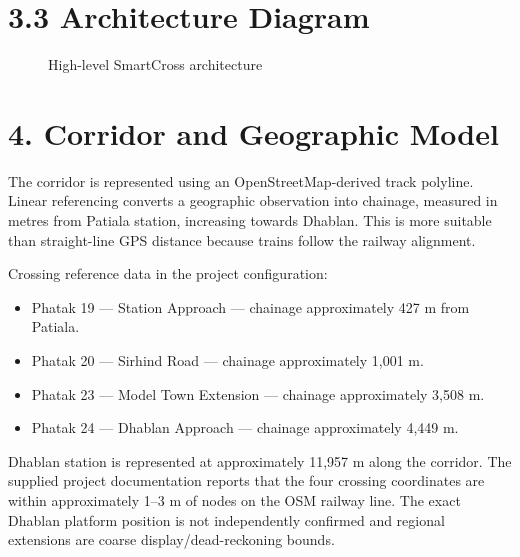\documentclass[12pt,a4paper]{report}
\begin{document}
\chapter{3.3 Architecture Diagram}
\begin{figure}[H]\centering
{}\caption{High-level SmartCross architecture}\end{figure}
\chapter{4. Corridor and Geographic Model}
The corridor is represented using an OpenStreetMap-derived track polyline. Linear referencing converts a geographic observation into chainage, measured in metres from Patiala station, increasing towards Dhablan. This is more suitable than straight-line GPS distance because trains follow the railway alignment.

Crossing reference data in the project configuration:

\begin{itemize}\item Phatak 19 --- Station Approach --- chainage approximately 427 m from Patiala.\end{itemize}
\begin{itemize}\item Phatak 20 --- Sirhind Road --- chainage approximately 1,001 m.\end{itemize}
\begin{itemize}\item Phatak 23 --- Model Town Extension --- chainage approximately 3,508 m.\end{itemize}
\begin{itemize}\item Phatak 24 --- Dhablan Approach --- chainage approximately 4,449 m.\end{itemize}
Dhablan station is represented at approximately 11,957 m along the corridor. The supplied project documentation reports that the four crossing coordinates are within approximately 1--3 m of nodes on the OSM railway line. The exact Dhablan platform position is not independently confirmed and regional extensions are coarse display/dead-reckoning bounds.
\end{document}
